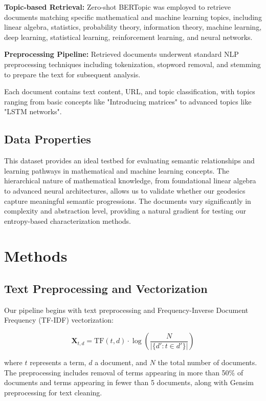 \documentclass[12pt,a4paper]{article}
\begin{document}
\textbf{Topic-based Retrieval:} Zero-shot BERTopic \cite{grootendorst2022bertopic} was employed to retrieve documents matching specific mathematical and machine learning topics, including linear algebra, statistics, probability theory, information theory, machine learning, deep learning, statistical learning, reinforcement learning, and neural networks.

\textbf{Preprocessing Pipeline:} Retrieved documents underwent standard NLP preprocessing techniques including tokenization, stopword removal, and stemming to prepare the text for subsequent analysis.

Each document contains text content, URL, and topic classification, with topics ranging from basic concepts like "Introducing matrices" to advanced topics like "LSTM networks".

\subsection{Data Properties}

This dataset provides an ideal testbed for evaluating semantic relationships and learning pathways in mathematical and machine learning concepts. The hierarchical nature of mathematical knowledge, from foundational linear algebra to advanced neural architectures, allows us to validate whether our geodesics capture meaningful semantic progressions.
The documents vary significantly in complexity and abstraction level, providing a natural gradient for testing our entropy-based characterization methods.

\section{Methods}

\subsection{Text Preprocessing and Vectorization}

Our pipeline begins with text preprocessing and Frequency-Inverse Document Frequency (TF-IDF) \cite{salton1988term} vectorization:

\begin{equation}
\mathbf{X}_{t,d} = \text{TF}(t,d) \cdot \log\left(\frac{N}{|\{d' : t \in d'\}|}\right)
\end{equation}

where $t$ represents a term, $d$ a document, and $N$ the total number of documents. The preprocessing includes removal of terms appearing in more than 50\% of documents and terms appearing in fewer than 5 documents, along with Gensim preprocessing for text cleaning.
\end{document}
